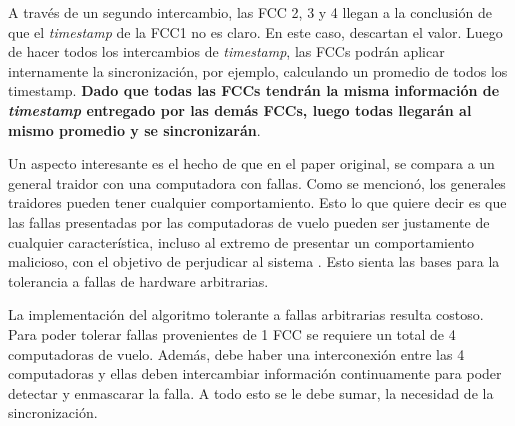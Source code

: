 A través de un segundo intercambio, las FCC 2, 3 y 4 llegan a la conclusión de que el \textit{timestamp} de la FCC1 no es claro. En este caso, descartan el valor. Luego de hacer todos los intercambios de \textit{timestamp}, las FCCs podrán aplicar internamente la sincronización, por ejemplo, calculando un promedio de todos los timestamp. \textbf{Dado que todas las FCCs tendrán la misma información de \textit{timestamp} entregado por las demás FCCs, luego todas llegarán al mismo promedio y se sincronizarán}.

Un aspecto interesante es el hecho de que en el paper original, se compara a un general traidor con una computadora con fallas. Como se mencionó, los generales traidores pueden tener cualquier comportamiento. Esto lo que quiere decir es que las fallas presentadas por las computadoras de vuelo pueden ser justamente de cualquier característica, incluso al extremo de presentar un comportamiento malicioso, con el objetivo de perjudicar al sistema \cite{lala1994architectural}. Esto sienta las bases para la tolerancia a fallas de hardware arbitrarias.

La implementación del algoritmo tolerante a fallas arbitrarias resulta costoso. Para poder tolerar fallas provenientes de 1 FCC se requiere un total de 4 computadoras de vuelo. Además, debe haber una interconexión entre las 4 computadoras y ellas deben intercambiar información continuamente para poder detectar y enmascarar la falla. A todo esto se le debe sumar, la necesidad de la sincronización.